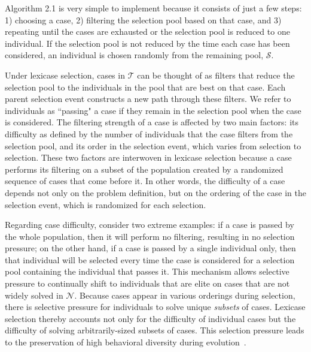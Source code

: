 \documentclass[twoside]{article}
\begin{document}
Algorithm 2.1 is very simple to implement because it consists of just a few steps: 1) choosing a case, 2) filtering the selection pool based on that case, and 3) repeating until the cases are exhausted or the selection pool is reduced to one individual. If the selection pool is not reduced by the time each case has been considered, an individual is chosen randomly from the remaining pool, $\mathcal{S}$. 

Under lexicase selection, cases in $\mathcal{T}$ can be thought of as filters that reduce the selection pool to the individuals in the pool that are best on that case. Each parent selection event constructs a new path through these filters. We refer to individuals as ``passing" a case if they remain in the selection pool when the case is considered. The filtering strength of a case is affected by two main factors: its difficulty as defined by the number of individuals that the case filters from the selection pool, and its order in the selection event, which varies from selection to selection. These two factors are interwoven in lexicase selection because a case performs its filtering on a subset of the population created by a randomized sequence of cases that come before it. In other words, the difficulty of a case depends not only on the problem definition, but on the ordering of the case in the selection event, which is randomized for each selection.

Regarding case difficulty, consider two extreme examples: if a case is passed by the whole population, then it will perform no filtering, resulting in no selection pressure; on the other hand, if a case is passed by a single individual only, then that individual will be selected every time the case is considered for a selection pool containing the individual that passes it. This mechanism allows selective pressure to continually shift to individuals that are elite on cases that are not widely solved in $\mathcal{N}$. Because cases appear in various orderings during selection, there is selective pressure for individuals to solve unique {\it subsets} of cases. Lexicase selection thereby accounts not only for the difficulty of individual cases but the difficulty of solving arbitrarily-sized subsets of cases. This selection pressure leads to the preservation of high behavioral diversity during evolution~\citep{Helmuth:2015:GPTP, la_cava_epsilon-lexicase_2016}. 
\end{document}

